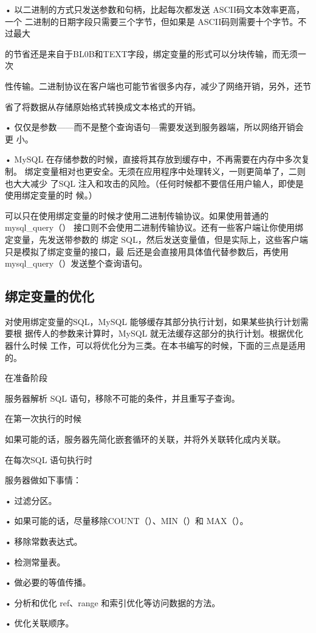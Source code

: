 • 以二进制的方式只发送参数和句柄，比起每次都发送 ASCII码文本效率更高，一个
二进制的日期字段只需要三个字节，但如果是 ASCII码则需要十个字节。不过最大

的节省还是来自于BL0B和TEXT字段，绑定变量的形式可以分块传输，而无须一次

性传输。二进制协议在客户端也可能节省很多内存，减少了网络开销，另外，还节

省了将数据从存储原始格式转换成文本格式的开销。

• 仅仅是参数——而不是整个查询语句—需要发送到服务器端，所以网络开销会更
小。

• MySQL 在存储参数的时候，直接将其存放到缓存中，不再需要在内存中多次复制。
绑定变量相对也更安全。无须在应用程序中处理转义，一则更简单了，二则也大大减少
了SQL 注入和攻击的风险。（任何时候都不要信任用户输人，即使是使用绑定变量的时
候。）

可以只在使用绑定变量的时候才使用二进制传输协议。如果使用普通的 mysql\_query（）
接口则不会使用二进制传输协议。还有一些客户端让你使用绑定变量，先发送带参数的
绑定 SQL，然后发送变量值，但是实际上，这些客户端只是模拟了绑定变量的接口，最
后还是会直接用具体值代替参数后，再使用 mysql\_query（）发送整个查询语句。

\subsection{绑定变量的优化}
对使用绑定变量的SQL，MySQL 能够缓存其部分执行计划，如果某些执行计划需要根
据传人的参数来计算时，MySQL 就无法缓存这部分的执行计划。根据优化器什么时候
工作，可以将优化分为三类。在本书编写的时候，下面的三点是适用的。

在准备阶段

服务器解析 SQL 语句，移除不可能的条件，并且重写子查询。

在第一次执行的时候

如果可能的话，服务器先简化嵌套循环的关联，并将外关联转化成内关联。

在每次SQL 语句执行时

服务器做如下事情：

• 过滤分区。

• 如果可能的话，尽量移除COUNT（）、MIN（）和 MAX（）。

• 移除常数表达式。

• 检测常量表。

• 做必要的等值传播。

• 分析和优化 ref、range 和索引优化等访问数据的方法。

• 优化关联顺序。

